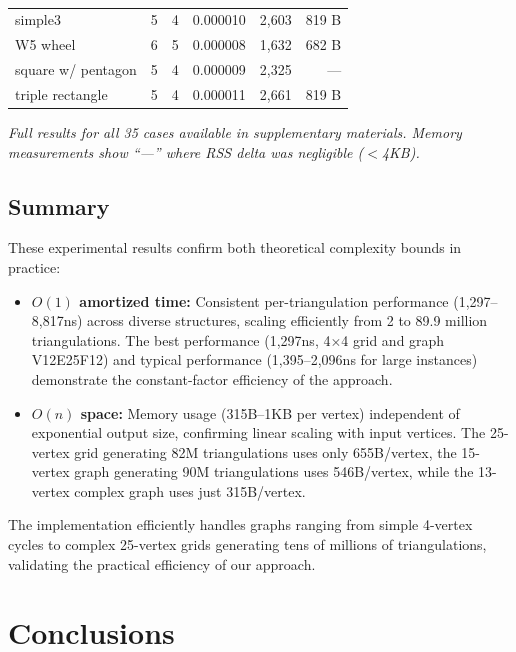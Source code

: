 ﻿﻿\documentclass[12pt,a4paper]{article}
\theoremstyle{definition}
\theoremstyle{remark}
\begin{document}
\begin{table}[htbp]
\begin{tabular}{|l|r|r|r|r|r|}
		simple3              & 5          & 4                       & 0.000010          & 2,603              & 819 B               \\
		W5 wheel             & 6          & 5                       & 0.000008          & 1,632              & 682 B               \\
		square w/ pentagon   & 5          & 4                       & 0.000009          & 2,325              & ---                 \\
		triple rectangle     & 5          & 4                       & 0.000011          & 2,661              & 819 B               \\
		\hline
	\end{tabular}
\end{table}

\textit{Full results for all 35 cases available in supplementary materials. Memory measurements show ``---'' where RSS delta was negligible ($<$4KB).}

\subsection{Summary}

These experimental results confirm both theoretical complexity bounds in practice:
\begin{itemize}
	\item \textbf{$O(1)$ amortized time:} Consistent per-triangulation performance (1,297--8,817ns) across diverse structures, scaling efficiently from 2 to 89.9 million triangulations. The best performance (1,297ns, 4$\times$4 grid and graph V12E25F12) and typical performance (1,395--2,096ns for large instances) demonstrate the constant-factor efficiency of the approach.
	\item \textbf{$O(n)$ space:} Memory usage (315B--1KB per vertex) independent of exponential output size, confirming linear scaling with input vertices. The 25-vertex grid generating 82M triangulations uses only 655B/vertex, the 15-vertex graph generating 90M triangulations uses 546B/vertex, while the 13-vertex complex graph uses just 315B/vertex.
\end{itemize}

The implementation efficiently handles graphs ranging from simple 4-vertex cycles to complex 25-vertex grids generating tens of millions of triangulations, validating the practical efficiency of our approach.

\section{Conclusions}
\label{sec:conclusion}
\end{document}
